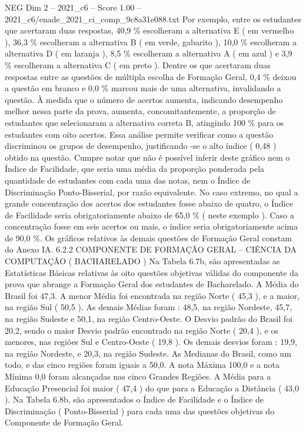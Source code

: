 \begin{textsample}{NEG Dim 2 – 2021\_c6 – Score 1.00 – 2021\_c6/enade\_2021\_ci\_comp\_9c8a31e088.txt}
Por exemplo, entre os estudantes que acertaram duas respostas, 40,9 \% escolheram a alternativa E ( em vermelho ), 36,3 \% escolheram a alternativa B ( em verde, gabarito ), 10,0 \% escolheram a alternativa D ( em laranja ), 8,5 \% escolheram a alternativa A ( em azul ) e 3,9 \% escolheram a alternativa C ( em preto ).
Dentre os que acertaram duas respostas entre as questões de múltipla escolha de Formação Geral, 0,4 \% deixou a questão em branco e 0,0 \% marcou mais de uma alternativa, invalidando a questão.
À medida que o número de acertos aumenta, indicando desempenho melhor nessa parte da prova, aumenta, concomitantemente, a proporção de estudantes que selecionaram a alternativa correta B, atingindo 100 \% para os estudantes com oito acertos.
Essa análise permite verificar como a questão discriminou os grupos de desempenho, justificando -se o alto índice ( 0,48 ) obtido na questão.
Cumpre notar que não é possível inferir deste gráfico nem o Índice de Facilidade, que seria uma média da proporção ponderada pela quantidade de estudantes com cada uma das notas, nem o Índice de Discriminação Ponto-Bisserial, por razão equivalente.
No caso extremo, no qual a grande concentração dos acertos dos estudantes fosse abaixo de quatro, o Índice de Facilidade seria obrigatoriamente abaixo de 65,0 \% ( neste exemplo ).
Caso a concentração fosse em seis acertos ou mais, o índice seria obrigatoriamente acima de 90,0 \%.
Os gráficos relativos às demais questões de Formação Geral constam do Anexo IA. 6.2.2 COMPONENTE DE FORMAÇÃO GERAL – CIÊNCIA DA COMPUTAÇÃO ( BACHARELADO ) Na Tabela 6.7b, são apresentadas as Estatísticas Básicas relativas às oito questões objetivas válidas do componente da prova que abrange a Formação Geral dos estudantes de Bacharelado.
A Média do Brasil foi 47,3.
A menor Média foi encontrada na região Norte ( 45,3 ), e a maior, na região Sul ( 50,5 ).
As demais Médias foram : 48,5, na região Nordeste, 45,7, na região Sudeste e 50,1, na região Centro-Oeste.
O Desvio padrão do Brasil foi 20,2, sendo o maior Desvio padrão encontrado na região Norte ( 20,4 ), e os menores, nas regiões Sul e Centro-Oeste ( 19,8 ).
Os demais desvios foram : 19,9, na região Nordeste, e 20,3, na região Sudeste.
As Medianas do Brasil, como um todo, e das cinco regiões foram iguais a 50,0.
A nota Máxima 100,0 e a nota Mínima 0,0 foram alcançadas nas cinco Grandes Regiões.
A Média para a Educação Presencial foi maior ( 47,4 ) do que para a Educação a Distância ( 43,0 ).
Na Tabela 6.8b, são apresentados o Índice de Facilidade e o Índice de Discriminação ( Ponto-Bisserial ) para cada uma das questões objetivas do Componente de Formação Geral.

\end{textsample}
